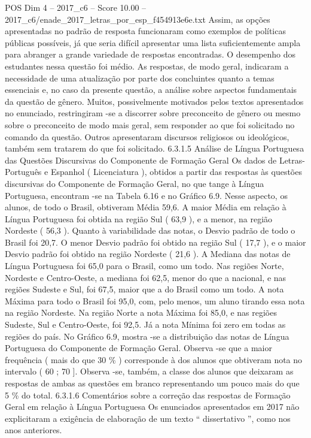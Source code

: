 \begin{textsample}{POS Dim 4 – 2017\_c6 – Score 10.00 – 2017\_c6/enade\_2017\_letras\_por\_esp\_f454913e6e.txt}
Assim, as opções apresentadas no padrão de resposta funcionaram como exemplos de políticas públicas possíveis, já que seria difícil apresentar uma lista suficientemente ampla para abranger a grande variedade de respostas encontradas.
O desempenho dos estudantes nessa questão foi médio.
As respostas, de modo geral, indicaram a necessidade de uma atualização por parte dos concluintes quanto a temas essenciais e, no caso da presente questão, a análise sobre aspectos fundamentais da questão de gênero.
Muitos, possivelmente motivados pelos textos apresentados no enunciado, restringiram -se a discorrer sobre preconceito de gênero ou mesmo sobre o preconceito de modo mais geral, sem responder ao que foi solicitado no comando da questão.
Outros apresentaram discursos religiosos ou ideológicos, também sem tratarem do que foi solicitado. 6.3.1.5 Análise de Língua Portuguesa das Questões Discursivas do Componente de Formação Geral Os dados de Letras-Português e Espanhol ( Licenciatura ), obtidos a partir das respostas às questões discursivas do Componente de Formação Geral, no que tange à Língua Portuguesa, encontram -se na Tabela 6.16 e no Gráfico 6.9.
Nesse aspecto, os alunos, de todo o Brasil, obtiveram Média 59,6.
A maior Média em relação à Língua Portuguesa foi obtida na região Sul ( 63,9 ), e a menor, na região Nordeste ( 56,3 ).
Quanto à variabilidade das notas, o Desvio padrão de todo o Brasil foi 20,7.
O menor Desvio padrão foi obtido na região Sul ( 17,7 ), e o maior Desvio padrão foi obtido na região Nordeste ( 21,6 ).
A Mediana das notas de Língua Portuguesa foi 65,0 para o Brasil, como um todo.
Nas regiões Norte, Nordeste e Centro-Oeste, a mediana foi 62,5, menor do que a nacional, e nas regiões Sudeste e Sul, foi 67,5, maior que a do Brasil como um todo.
A nota Máxima para todo o Brasil foi 95,0, com, pelo menos, um aluno tirando essa nota na região Nordeste.
Na região Norte a nota Máxima foi 85,0, e nas regiões Sudeste, Sul e Centro-Oeste, foi 92,5.
Já a nota Mínima foi zero em todas as regiões do país.
No Gráfico 6.9, mostra -se a distribuição das notas de Língua Portuguesa do Componente de Formação Geral.
Observa -se que a maior frequência ( mais do que 30 \% ) corresponde à dos alunos que obtiveram nota no intervalo ( 60 ; 70 ].
Observa -se, também, a classe dos alunos que deixaram as respostas de ambas as questões em branco representando um pouco mais do que 5 \% do total. 6.3.1.6 Comentários sobre a correção das respostas de Formação Geral em relação à Língua Portuguesa Os enunciados apresentados em 2017 não explicitaram a exigência de elaboração de um texto “ dissertativo ”, como nos anos anteriores.

\end{textsample}
